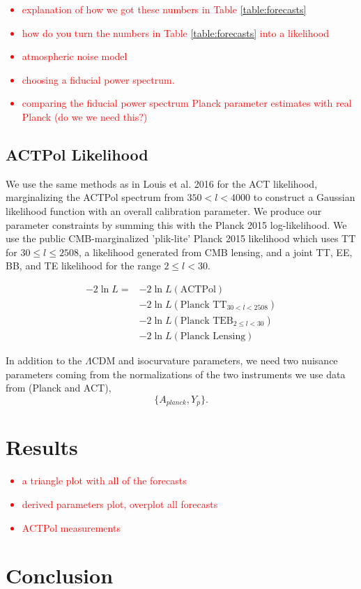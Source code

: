 \documentclass[11pt,a4paper]{emulateapj}
\newcommand\writingnote[1]{\textcolor{red}{#1}}
\begin{document}
\writingnote{
    \begin{itemize}
        \item explanation of how we got these numbers in Table \ref{table:forecasts}
        \item how do you turn the numbers in Table \ref{table:forecasts} into a likelihood
        \item atmospheric noise model
        \item choosing a fiducial power spectrum. 
        \item comparing the fiducial power spectrum Planck parameter estimates with real Planck (do we we need this?)
    \end{itemize}
}




\subsection{ACTPol Likelihood}

We use the same methods as in Louis et al. 2016 for the ACT likelihood, marginalizing the ACTPol spectrum from $350 < l < 4000$ to construct a Gaussian likelihood function with an overall calibration parameter. We produce our parameter constraints by summing this with the Planck 2015 log-likelihood. We use the public CMB-marginalized 'plik-lite' Planck 2015 likelihood which uses TT for $30 \leq l \leq 2508$, a likelihood generated from CMB lensing, and a joint TT, EE, BB, and TE likelihood for the range $2 \leq l < 30$. 

\begin{align}
-2 \ln L = &- 2 \ln L(\text{ACTPol}) \\
&-2 \ln L(\text{Planck TT}_{30 < l < 2508}) \\ 
&-2 \ln L(\text{Planck TEB}_{2 \leq l < 30})\\ 
&-2 \ln L(\text{Planck Lensing})
\end{align}

In addition to the $\Lambda$CDM and isocurvature parameters, we need two nuisance parameters coming from the normalizations of the two instruments we use data from (Planck and ACT),
\begin{equation}
\{ A_{planck}, Y_p \}.
\end{equation}

\section{Results}

\writingnote{
    \begin{itemize}
        \item a triangle plot with all of the forecasts
        \item derived parameters plot, overplot all forecasts
        \item ACTPol measurements 
    \end{itemize}
}

\section{Conclusion}



\end{document}
